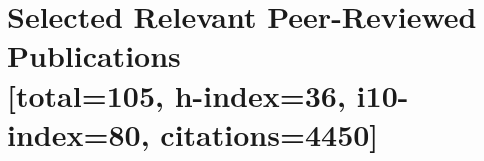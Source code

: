\documentclass[11pt]{article}
\begin{document}
\begin{tabular}{ll}
\end{tabular}


\section*{Selected Relevant Peer-Reviewed Publications \\  \small{[total=105, h-index=36, i10-index=80, citations=4450]}}
\vspace{-0.5cm}
\setlength{\extrarowheight}{10pt}
\end{document}
